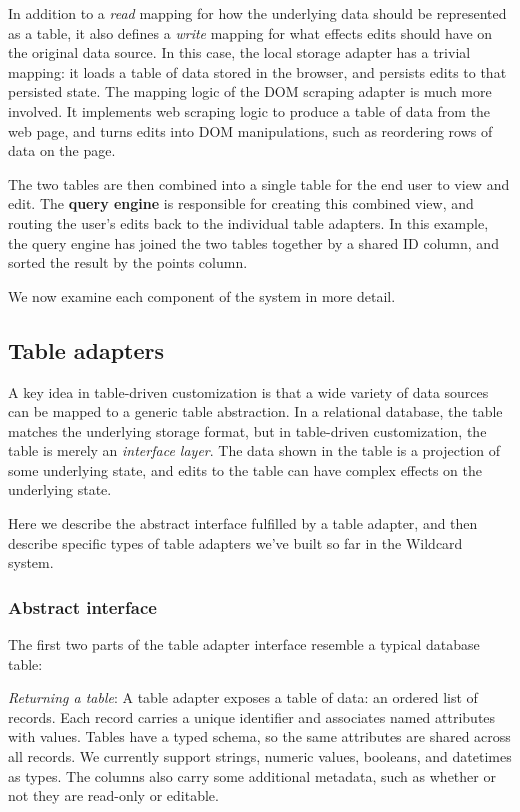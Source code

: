 \documentclass[sigplan,screen,10pt,anonymous,review]{acmart}
\begin{document}
In addition to a \emph{read} mapping for how the underlying data should
be represented as a table, it also defines a \emph{write} mapping for
what effects edits should have on the original data source. In this
case, the local storage adapter has a trivial mapping: it loads a table
of data stored in the browser, and persists edits to that persisted
state. The mapping logic of the DOM scraping adapter is much more
involved. It implements web scraping logic to produce a table of data
from the web page, and turns edits into DOM manipulations, such as
reordering rows of data on the page.

The two tables are then combined into a single table for the end user to
view and edit. The \textbf{query engine} is responsible for creating
this combined view, and routing the user's edits back to the individual
table adapters. In this example, the query engine has joined the two
tables together by a shared ID column, and sorted the result by the
points column.

We now examine each component of the system in more detail.

\hypertarget{table-adapters}{%
\subsection{Table adapters}\label{table-adapters}}

A key idea in table-driven customization is that a wide variety of data
sources can be mapped to a generic table abstraction. In a relational
database, the table matches the underlying storage format, but in
table-driven customization, the table is merely an \emph{interface
layer}. The data shown in the table is a projection of some underlying
state, and edits to the table can have complex effects on the underlying
state.

Here we describe the abstract interface fulfilled by a table adapter,
and then describe specific types of table adapters we've built so far in
the Wildcard system.

\hypertarget{abstract-interface}{%
\subsubsection{Abstract interface}\label{abstract-interface}}

The first two parts of the table adapter interface resemble a typical
database table:

\emph{Returning a table}: A table adapter exposes a table of data: an
ordered list of records. Each record carries a unique identifier and
associates named attributes with values. Tables have a typed schema, so
the same attributes are shared across all records. We currently support
strings, numeric values, booleans, and datetimes as types. The columns
also carry some additional metadata, such as whether or not they are
read-only or editable.
\end{document}
